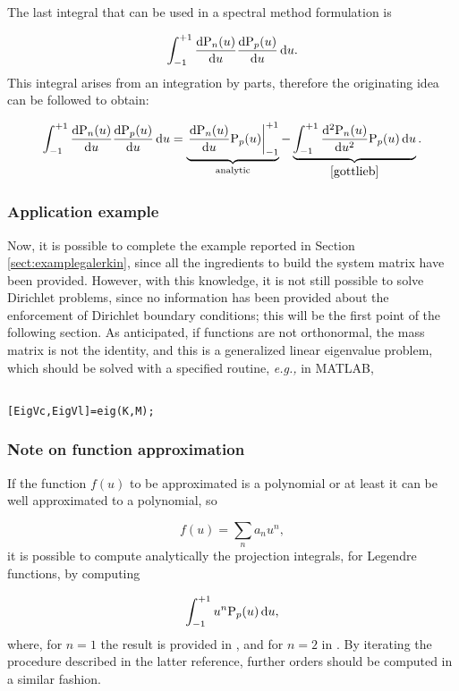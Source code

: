 \documentclass[a4paper,12pt]{article}
\begin{document}
The last integral that can be used in a spectral method formulation is

\[
\int_{-1}^{+1} \frac{\mathrm{d} \mathrm{P}_n(u)}{\mathrm{d} u} \frac{\mathrm{d} \mathrm{P}_p(u)}{\mathrm{d} u} \, \mathrm{d} u.
\]
This integral arises from an integration by parts, therefore the originating idea can be followed to obtain:

\[
\int_{-1}^{+1} \frac{\rd \rP_n(u)}{\rd u} \frac{\rd \rP_p(u)}{\rd u} \, \rd u = \underbrace{\val{\frac{\rd \rP_n(u)}{\rd u} \rP_p(u)}_{-1}^{+1}}\p{analytic} - \underbrace{\int_{-1}^{+1} \frac{\rd^2 \rP_n(u)}{\rd u^2} \rP_p(u) \, \rd u}\p{\cite[(A.31)]{gottlieb} }.
\]

\subsubsection{Application example}

Now, it is possible to complete the example reported in Section \ref{sect:examplegalerkin}, since all the ingredients to build the system matrix have been provided. However, with this knowledge, it is not still possible to solve Dirichlet problems, since no information has been provided about the enforcement of Dirichlet boundary conditions; this will be the first point of the following section. As anticipated, if functions are not orthonormal, the mass matrix is not the identity, and this is a generalized linear eigenvalue problem, which should be solved with a specified routine, \textit{e.g.,} in MATLAB,

\begin{verbatim}

[EigVc,EigVl]=eig(K,M);

\end{verbatim}

\subsubsection{Note on function approximation}

If the function $f(u)$ to be approximated is a polynomial or at least it can be well approximated to a polynomial, so

\[
f(u) = \sum_n a_n u^n,
\]
it is possible to compute analytically the projection integrals, for Legendre functions, by computing

\[
\int_{-1}^{+1} u^n \mathrm{P}_p(u) \, \mathrm{d} u,
\]
where, for $n=1$ the result is provided in \cite[eq. (A.32)]{gottlieb}, and for $n=2$ in \cite{tibaldimsc}. By iterating the procedure described in the latter reference, further orders should be computed in a similar fashion.
\end{document}

